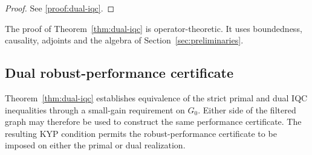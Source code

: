 \begin{proof}
    See \ref{proof:dual-iqc}.
\end{proof}
The proof of Theorem~\ref{thm:dual-iqc} is operator-theoretic. It uses
boundedness, causality, adjoints and the algebra of Section~\ref{sec:preliminaries}.

\subsection{Dual robust-performance certificate}
\dualsystemcomponents

Theorem~\ref{thm:dual-iqc} establishes equivalence of the strict primal and dual IQC
inequalities through a small-gain requirement on $G_0$. Either side of the
filtered graph may therefore be used to construct the same performance
certificate. The resulting
KYP condition permits the robust-performance certificate to be imposed on
either the primal or dual realization. 
